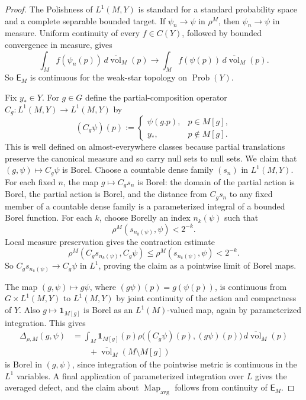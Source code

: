 \documentclass[12pt]{amsart}
\theoremstyle{definition}
\newcommand{\vol}{\operatorname{vol}}
\newcommand{\Prob}{\operatorname{Prob}}
\newcommand{\Mapavg}{\operatorname{Map}_{\mathrm{avg}}}
\newcommand{\1}{\mathbf 1}
\begin{document}
\begin{proof}
	The Polishness of $L^1(M,Y)$ is standard for a standard probability space
	and a complete separable bounded target. If $\psi_n\to\psi$ in
	$\rho^M$, then $\psi_n\to\psi$ in measure. Uniform continuity of every
	$f\in C(Y)$, followed by bounded convergence in measure, gives
	\[
	\int_M f(\psi_n(p))\,d\overline{\vol}_M(p)
	\longrightarrow
	\int_M f(\psi(p))\,d\overline{\vol}_M(p).
	\]
	So $\mathsf E_M$ is continuous for the weak-star topology on
	$\Prob(Y)$.
	
	Fix $y_*\in Y$. For $g\in G$ define the partial-composition operator
	$C_g:L^1(M,Y)\to L^1(M,Y)$ by
	\[
	(C_g\psi)(p):=
	\begin{cases}
		\psi(g.p),&p\in M[g],\\
		y_*,&p\notin M[g].
	\end{cases}
	\]
	This is well defined on almost-everywhere classes because partial
	translations preserve the canonical measure and so carry null sets to null
	sets. We claim that $(g,\psi)\mapsto C_g\psi$ is Borel. Choose a countable
	dense family $(s_n)$ in $L^1(M,Y)$. For each fixed $n$, the map
	$g\mapsto C_gs_n$ is Borel: the domain of the partial action is Borel, the
	partial action is Borel, and the distance from $C_gs_n$ to any fixed member of
	a countable dense family is a parameterized integral of a bounded Borel
	function. For each $k$, choose Borelly an index $n_k(\psi)$ such that
	\[
	\rho^M(s_{n_k(\psi)},\psi)<2^{-k}.
	\]
	Local measure preservation gives the contraction estimate
	\[
	\rho^M(C_gs_{n_k(\psi)},C_g\psi)
	\leq \rho^M(s_{n_k(\psi)},\psi)<2^{-k}.
	\]
	So $C_gs_{n_k(\psi)}\to C_g\psi$ in $L^1$, proving the claim as a
	pointwise limit of Borel maps.
	
	The map $(g,\psi)\mapsto g\psi$, where $(g\psi)(p)=g(\psi(p))$, is
	continuous from $G\times L^1(M,Y)$ to $L^1(M,Y)$ by joint continuity of the
	action and compactness of $Y$. Also
	$g\mapsto\1_{M[g]}$ is Borel as an $L^1(M)$-valued map, again by
	parameterized integration. This gives
	\begin{align*}
		\Delta_{\rho,M}(g,\psi)
		&=\int_M\1_{M[g]}(p)
		\rho\bigl((C_g\psi)(p),(g\psi)(p)\bigr)
		\,d\overline{\vol}_M(p)\\
		&\qquad+\overline{\vol}_M(M\setminus M[g])
	\end{align*}
	is Borel in $(g,\psi)$, since integration of the pointwise metric is
	continuous in the $L^1$ variables. A final application of parameterized
	integration over $L$ gives the averaged defect, and the claim about
	$\Mapavg$ follows from continuity of $\mathsf E_M$.
\end{proof}
\end{document}
